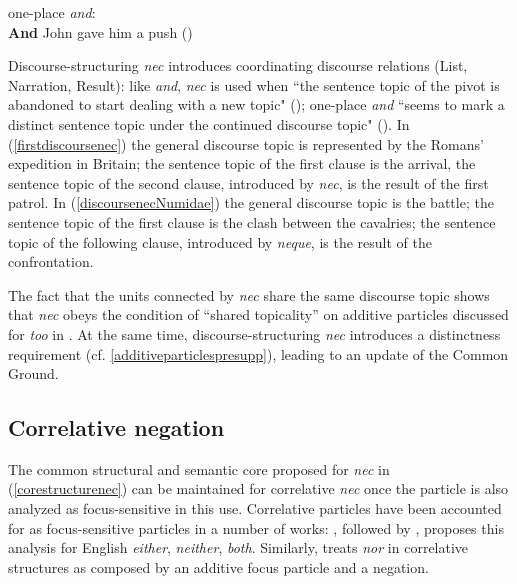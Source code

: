 \documentclass[output=paper]{langsci/langscibook}
\begin{document}
{\begin{exe}
\ex one-place {\emph{and}}:\\
{\textbf{And}} John gave him a push (\citealt[their ex. 7]{ZeevatJasinskaja07})
\end{exe}}

 \noindent Discourse-structuring {\emph{nec}} introduces coordinating discourse relations (List, Narration, Result): like {\emph{and}}, {\emph{nec}} is used when ``the sentence topic of the pivot is abandoned to start dealing with a new topic" (\citealt[325]{ZeevatJasinskaja07}); one-place {\emph{and}} ``seems to mark a distinct sentence topic under the continued discourse topic" (\citealt[325]{ZeevatJasinskaja07}). In (\ref{firstdiscoursenec}) the general discourse topic is represented by the Romans' expedition in Britain; the sentence topic of the first clause is the arrival, the sentence topic of the second clause, introduced by {\emph{nec}}, is the result of the first patrol. In (\ref{discoursenecNumidae}) the general discourse topic is the battle; the sentence topic of the first clause is the clash between the cavalries; the sentence topic of the following clause, introduced by {\emph{neque}}, is the result of the confrontation.

The fact that the units connected by {\emph{nec}} share the same discourse topic shows that {\emph{nec}} obeys the condition of ``shared topicality'' on additive particles discussed for {\emph{too}} in \citet[]{SchwenterWaltereit10}. At the same time, discourse-structuring {\emph{nec}} introduces a distinctness requirement (cf. \ref{additiveparticlespresupp}), leading to an update of the Common Ground.

\subsection{Correlative negation} \label{analysiscorrelative}

The common structural and semantic core proposed for {\emph{nec}} in (\ref{corestructurenec}) can be maintained for correlative {\emph{nec}} once the particle is also analyzed as focus-sensitive in this use. Correlative particles have been accounted for as focus-sensitive particles in a number of works: \citet{Hendriks04}, followed by \citet{denDikken06}, proposes this analysis for English {\emph{either}}, {\emph{neither}}, {\emph{both}}. Similarly, \citet{Wurmbrand08} treats {\emph{nor}} in correlative structures as composed by an additive focus particle and a negation.
\end{document}
